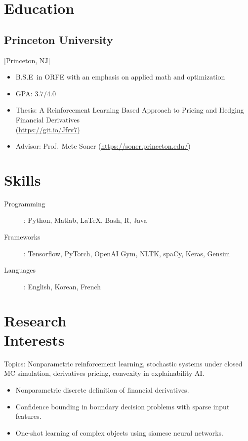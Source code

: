 \documentclass{rkim-resume}
\begin{document}
\section{Education}

\subsection{Princeton University}[Princeton, NJ]
\vspace{-\parskip}%
\begin{itemize}[label={}]
  \item B.S.E\ in ORFE with an emphasis on applied math and optimization
  \item GPA: 3.7/4.0
  \item Thesis: {A Reinforcement Learning Based Approach to Pricing and Hedging Financial Derivatives}\href{https://github.com/russellkim98/Thesis/blob/master/Russell-Kim-Thesis.pdf}{\\(https://git.io/Jfrv7)}
  \item Advisor: Prof.~Mete Soner (\href{https://soner.princeton.edu/}{https://soner.princeton.edu/})
\end{itemize}
\section{Skills}


\begin{description}
  \item[Programming]: Python, Matlab, \LaTeX, Bash, R, Java
  \item[Frameworks]: Tensorflow, PyTorch, OpenAI Gym, NLTK, spaCy, Keras, Gensim
  \item[Languages]: English, Korean, French
\end{description}


\section{Research \\ Interests}

Topics: Nonparametric reinforcement learning, stochastic systems under closed MC simulation, derivatives pricing, convexity in explainability AI.

\begin{itemize}
  \item Nonparametric discrete definition of financial derivatives.
  \item Confidence bounding in boundary decision problems with sparse input features.
  \item One-shot learning of complex objects using siamese neural networks.
\end{itemize}
\end{document}
